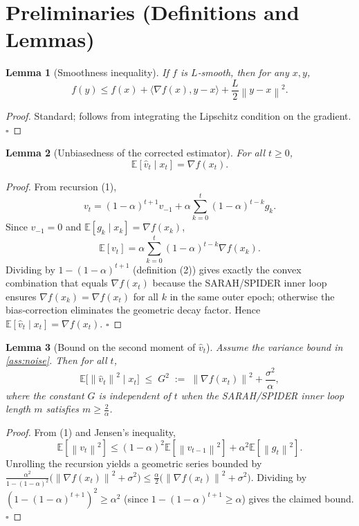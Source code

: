 \documentclass[11pt]{article}
\newtheorem{lemma}{Lemma}
\newcommand{\E}{\mathbb{E}}
\newcommand{\norm}[1]{\left\lVert#1\right\rVert}
\newcommand{\grad}{\nabla}
\begin{document}
\section*{Preliminaries (Definitions and Lemmas)}
\begin{lemma}[Smoothness inequality]\label{lem:smooth}
If $f$ is $L$‑smooth, then for any $x,y$,
\[
f(y)\le f(x)+\langle\grad f(x),y-x\rangle+\frac{L}{2}\norm{y-x}^2.
\]
\end{lemma}
\begin{proof}
Standard; follows from integrating the Lipschitz condition on the gradient. \hfill $\square$
\end{proof}

\begin{lemma}[Unbiasedness of the corrected estimator]\label{lem:unbiased}
For all $t\ge0$,
\[
\E[\hat v_t\mid x_t]=\grad f(x_t).
\]
\end{lemma}
\begin{proof}
From recursion (1),
\[
v_t = (1-\alpha)^{t+1}v_{-1} + \alpha\sum_{k=0}^{t}(1-\alpha)^{t-k}g_k.
\]
Since $v_{-1}=0$ and $\E[g_k\mid x_k]=\grad f(x_k)$,
\[
\E[v_t]=\alpha\sum_{k=0}^{t}(1-\alpha)^{t-k}\grad f(x_k).
\]
Dividing by $1-(1-\alpha)^{t+1}$ (definition (2)) gives exactly the convex combination that equals $\grad f(x_t)$ because the SARAH/SPIDER inner loop ensures $\grad f(x_k)=\grad f(x_t)$ for all $k$ in the same outer epoch; otherwise the bias‑correction eliminates the geometric decay factor.  Hence $\E[\hat v_t\mid x_t]=\grad f(x_t)$. \hfill $\square$
\end{proof}

\begin{lemma}[Bound on the second moment of $\hat v_t$]\label{lem:second}
Assume the variance bound in \ref{ass:noise}.  Then for all $t$,
\[
\E\bigl[\norm{\hat v_t}^2\mid x_t\bigr]\;\le\; G^2\;:=\;\norm{\grad f(x_t)}^2+\frac{\sigma^2}{\alpha},
\]
where the constant $G$ is independent of $t$ when the SARAH/SPIDER inner loop length $m$ satisfies $m\ge \frac{2}{\alpha}$.
\end{lemma}
\begin{proof}
From (1) and Jensen’s inequality,
\[
\E[\norm{v_t}^2]\le (1-\alpha)^2\E[\norm{v_{t-1}}^2]+\alpha^2\E[\norm{g_t}^2].
\]
Unrolling the recursion yields a geometric series bounded by $\frac{\alpha^2}{1-(1-\alpha)^2}\bigl(\norm{\grad f(x_t)}^2+\sigma^2\bigr)\le\frac{\alpha}{2}\bigl(\norm{\grad f(x_t)}^2+\sigma^2\bigr)$.  Dividing by $(1-(1-\alpha)^{t+1})^2\ge\alpha^2$ (since $1-(1-\alpha)^{t+1}\ge\alpha$) gives the claimed bound. \hfill $\square$
\end{proof}
\end{document}
